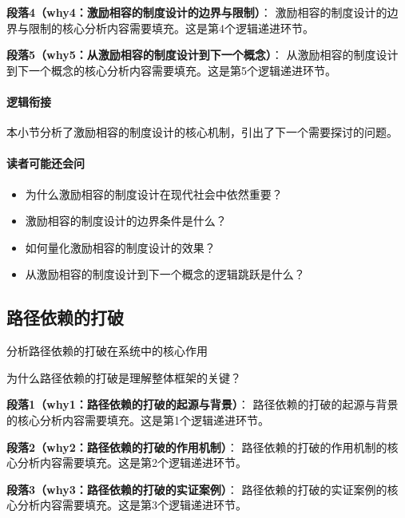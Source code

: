 \documentclass[../main.tex]{subfiles}
\begin{document}
\textbf{段落4（why4：激励相容的制度设计的边界与限制）}：
激励相容的制度设计的边界与限制的核心分析内容需要填充。这是第4个逻辑递进环节。


\textbf{段落5（why5：从激励相容的制度设计到下一个概念）}：
从激励相容的制度设计到下一个概念的核心分析内容需要填充。这是第5个逻辑递进环节。


\paragraph*{逻辑衔接}
本小节分析了激励相容的制度设计的核心机制，引出了下一个需要探讨的问题。

\paragraph*{读者可能还会问}
\begin{itemize}
\item 为什么激励相容的制度设计在现代社会中依然重要？
\item 激励相容的制度设计的边界条件是什么？
\item 如何量化激励相容的制度设计的效果？
\item 从激励相容的制度设计到下一个概念的逻辑跳跃是什么？
\end{itemize}


\subsection{路径依赖的打破}

\begin{motivation}
分析路径依赖的打破在系统中的核心作用
\end{motivation}

\begin{logicmap}
[逻辑链占位]
\end{logicmap}

\begin{questionbox}
为什么路径依赖的打破是理解整体框架的关键？
\end{questionbox}

\textbf{段落1（why1：路径依赖的打破的起源与背景）}：
路径依赖的打破的起源与背景的核心分析内容需要填充。这是第1个逻辑递进环节。


\textbf{段落2（why2：路径依赖的打破的作用机制）}：
路径依赖的打破的作用机制的核心分析内容需要填充。这是第2个逻辑递进环节。


\textbf{段落3（why3：路径依赖的打破的实证案例）}：
路径依赖的打破的实证案例的核心分析内容需要填充。这是第3个逻辑递进环节。
\end{document}
